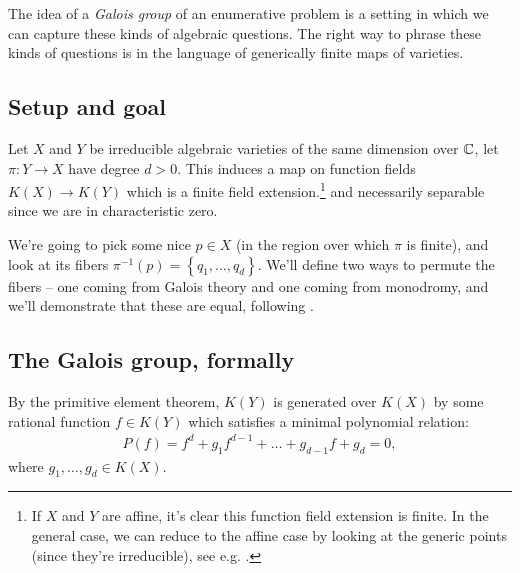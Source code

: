 \documentclass[11pt]{amsart}
\begin{document}
The idea of a \textit{Galois group} of an enumerative problem is a setting in which we can capture these kinds of algebraic questions. The right way to phrase these kinds of questions is in the language of generically finite maps of varieties.

\subsection{Setup and goal}

Let $X$ and $Y$ be irreducible algebraic varieties of the same dimension over $\mathbb{C}$, let $\pi \colon Y \to X$ have degree $d>0$. This induces a map on function fields $K(X) \to K(Y)$ which is a finite field extension.\footnote{If $X$ and $Y$ are affine, it's clear this function field extension is finite. In the general case, we can reduce to the affine case by looking at the generic points (since they're irreducible), see e.g. \cite[02NW]{Stacks}.} and necessarily separable since we are in characteristic zero.

We're going to pick some nice $p \in X$ (in the region over which $\pi$ is finite), and look at its fibers $\pi^{-1}(p) = \left\{ q_1, \ldots, q_d \right\}$. We'll define two ways to permute the fibers -- one coming from Galois theory and one coming from monodromy, and we'll demonstrate that these are equal, following \cite[\S1]{Harris-Galois}.

\subsection{The Galois group, formally}

By the primitive element theorem, $K(Y)$ is generated over $K(X)$ by some rational function $f \in K(Y)$ which satisfies a minimal polynomial relation:
\begin{align*}
    P(f) = f^d + g_1 f^{d-1} + \ldots + g_{d-1}f + g_d = 0,
\end{align*}
where $g_1, \ldots, g_d\in K(X)$.
\end{document}
